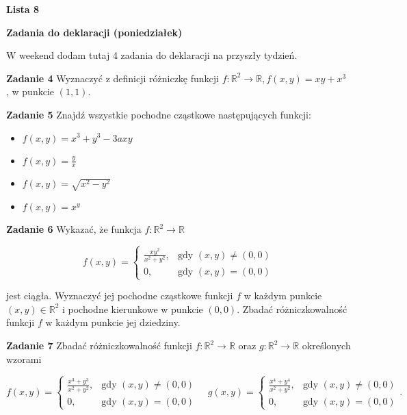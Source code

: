 \documentclass[a4paper,11pt]{article}
\begin{document}
\begin{center}
  {\large\textbf{Lista 8}}
\end{center}

\hrulefill
\begin{center}
    \textbf{Zadania do deklaracji (poniedziałek)}
\end{center}

\bigskip

W weekend dodam tutaj 4 zadania do deklaracji na przyszły tydzień.
\bigskip

\hrulefill

\bigskip

\textbf{Zadanie 4} Wyznaczyć z definicji różniczkę funkcji $f :
\mathbb{R}^2 \to \mathbb{R}, f(x, y) = xy + x^3$ , w punkcie $(1, 1)$.

\bigskip

\textbf{Zadanie 5} Znajdź wszystkie pochodne cząstkowe następujących
funkcji:

\begin{multicols}{2}
    \begin{itemize}
        \item $f(x,y) = x^3 + y^3 - 3axy$ 
        \item $f(x,y) = \frac{y}{x}$ 
        \item $f(x,y) = \sqrt{x^2 - y^2} $ 
        \item $f(x,y) = x^y$
    \end{itemize}
\end{multicols}

\bigskip

\textbf{Zadanie 6} Wykazać, że funkcja $f: \mathbb{R}^2 \to \mathbb{R}$

\[
f(x,y) =
\begin{cases}
    \frac{xy^2}{x^2 + y^2}, & \text{gdy~} (x,y) \neq (0,0) \\
    0, & \text{gdy~} (x,y) = (0,0)
\end{cases}
\] 

jest ciągła. Wyznaczyć jej pochodne cząstkowe funkcji $f$ w każdym punkcie
$(x, y) \in \mathbb{R}^2$ i pochodne kierunkowe w punkcie $(0, 0)$. Zbadać
różniczkowalność funkcji $f$ w każdym punkcie jej dziedziny.

\bigskip

\textbf{Zadanie 7} Zbadać różniczkowalność funkcji $f: \mathbb{R}^2 \to
\mathbb{R}$ oraz $g: \mathbb{R}^2 \to \mathbb{R}$ określonych wzorami

\[
f(x,y) = 
\begin{cases}
    \frac{x^3+y^3}{x^2+y^2}, & \text{gdy~} (x,y) \neq (0,0) \\
    0, & \text{gdy~} (x,y) = (0,0)
\end{cases}
\quad
g(x,y) =
\begin{cases}
    \frac{x^4+y^4}{x^2+y^2}, & \text{gdy~} (x,y) \neq (0,0) \\
    0, & \text{gdy~} (x,y) = (0,0)
\end{cases}
.\] 
\end{document}
